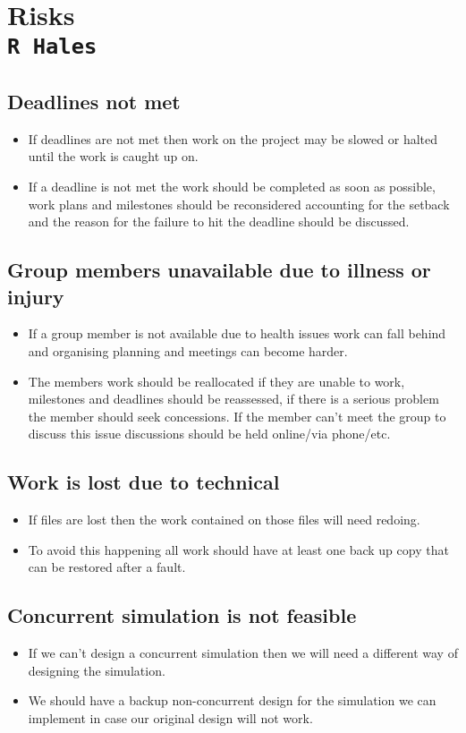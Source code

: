 \pagestyle{empty}

\section{Risks\\{\small\tt R~Hales}}
\subsection{Deadlines not met}
\begin{itemize}
\item If deadlines are not met then work on the project may be slowed or halted  until the work is caught up on.
\item If a deadline is not met the work should be completed as soon as possible, work plans and milestones should be reconsidered accounting for the setback and the reason for the failure to hit the deadline should be discussed.
\end{itemize}
\subsection{Group members unavailable due to illness or injury}
\begin{itemize}
\item If a group member is not available due to health issues work can fall behind and organising planning and meetings can become harder.
\item The members work should be reallocated if they are unable to work, milestones and deadlines should be reassessed, if there is a serious problem the member should seek concessions. If the member can't meet the group to discuss this issue discussions should be held online/via phone/etc.
\end{itemize}
\subsection{Work is lost due to technical}
\begin{itemize}
\item If files are lost then the work contained on those files will need redoing.
\item To avoid this happening all work should have at least one back up copy that can be restored after a fault.
\end{itemize}
\subsection{Concurrent simulation is not feasible}
\begin{itemize}
\item If we can't design a concurrent simulation then we will need a different way of designing the simulation.
\item We should have a backup non-concurrent design for the simulation we can implement in case our original design will not work.
\end{itemize}
\clearpage
\endinput
